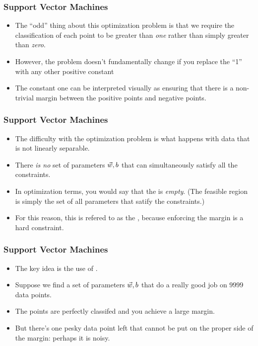 \documentclass[trans,aspectratio=169]{beamer}
\begin{document}
\begin{frame}
  \frametitle{Support Vector Machines}
\begin{itemize}
\item 
The ``odd'' thing about this optimization problem is that we require
the classification of each point to be greater than \emph{one} rather
than simply greater than \emph{zero}.  
\item However, the problem doesn't
fundamentally change if you replace the ``1'' with any other positive
constant
\item The constant one can be interpreted
visually as ensuring that there is a non-trivial margin between the
positive points and negative points.
\end{itemize}
\end{frame}
\begin{frame}
  \frametitle{Support Vector Machines}
\begin{itemize}
\item 
The difficulty with the optimization problem is what happens with data that is not
linearly separable.  
\item There \emph{is no} set of
parameters ${\vec w},b$ that can simultaneously satisfy all the
constraints.
\item   In optimization terms, you would say that the
 is \emph{empty}.  (The feasible region is
simply the set of all parameters that satify the constraints.)  
\item For
this reason, this is refered to as the ,
because enforcing the margin is a hard constraint. 
\end{itemize}
\end{frame}
\begin{frame}
  \frametitle{Support Vector Machines}
\begin{itemize}
\item 
The key idea is the use of .  
\item Suppose we find a set of
parameters ${\vec w},b$ that do a really good job on $9999$ data points.
\item The points are perfectly classifed and you achieve a large margin.
\item But there's one pesky data point left that cannot be put on the proper
side of the margin: perhaps it is noisy. 
\end{itemize}
\end{frame}
\end{document}
